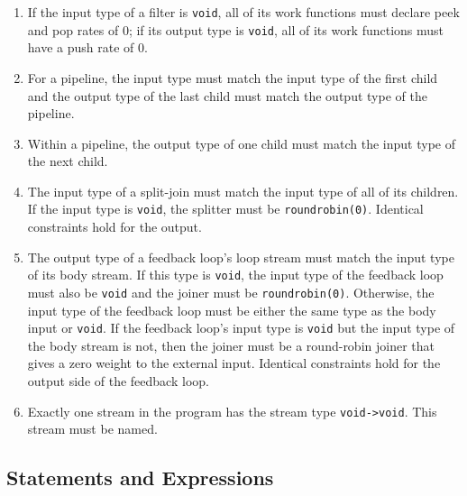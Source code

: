 \documentclass[11pt]{article}
\begin{document}
\begin{enumerate}
\item If the input type of a filter is \lstinline|void|, all of its
  work functions must declare peek and pop rates of 0; if its output
  type is \lstinline|void|, all of its work functions must have a push
  rate of 0.
\item For a pipeline, the input type must match the input type of the
  first child and the output type of the last child must match the
  output type of the pipeline.
\item Within a pipeline, the output type of one child must match the
  input type of the next child.
\item The input type of a split-join must match the input type of all
  of its children.  If the input type is \lstinline|void|, the
  splitter must be \lstinline|roundrobin(0)|.  Identical constraints
  hold for the output.
\item The output type of a feedback loop's loop stream must match the
  input type of its body stream.  If this type is \lstinline|void|,
  the input type of the feedback loop must also be \lstinline|void|
  and the joiner must be \lstinline|roundrobin(0)|.  Otherwise, the
  input type of the feedback loop must be either the same type as the
  body input or \lstinline|void|.  If the feedback loop's input type
  is \lstinline|void| but the input type of the body stream is not,
  then the joiner must be a round-robin joiner that gives a zero
  weight to the external input.  Identical constraints hold for the
  output side of the feedback loop.
\item Exactly one stream in the program has the stream type
  \lstinline|void->void|.  This stream must be named.
\end{enumerate}

\subsection{Statements and Expressions}
\end{document}
